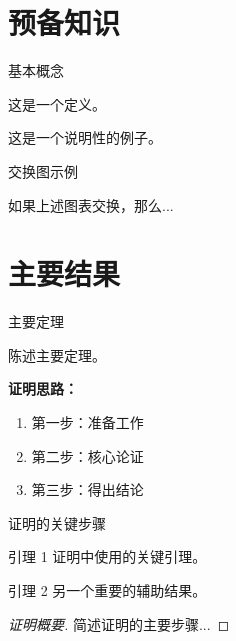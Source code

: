 \documentclass[aspectratio=169,11pt]{beamer}
\begin{document}
\section{预备知识}

\begin{frame}{基本概念}
    \begin{definition}
        这是一个定义。
    \end{definition}

    \begin{example}
        这是一个说明性的例子。
    \end{example}
\end{frame}

\begin{frame}{交换图示例}
    \begin{center}
    \end{center}

    \pause

    \begin{theorem}
        如果上述图表交换，那么...
    \end{theorem}
\end{frame}

\section{主要结果}

\begin{frame}{主要定理}
    \begin{theorem}[主要结果]
        陈述主要定理。
    \end{theorem}

    \pause

    \textbf{证明思路：}
    \begin{enumerate}
        \item<3-> 第一步：准备工作
        \item<4-> 第二步：核心论证
        \item<5-> 第三步：得出结论
    \end{enumerate}
\end{frame}

\begin{frame}{证明的关键步骤}
    \begin{block}{引理 1}
        证明中使用的关键引理。
    \end{block}

    \begin{block}{引理 2}
        另一个重要的辅助结果。
    \end{block}

    \pause

    \begin{proof}[证明概要]
        简述证明的主要步骤...
    \end{proof}
\end{frame}
\end{document}
